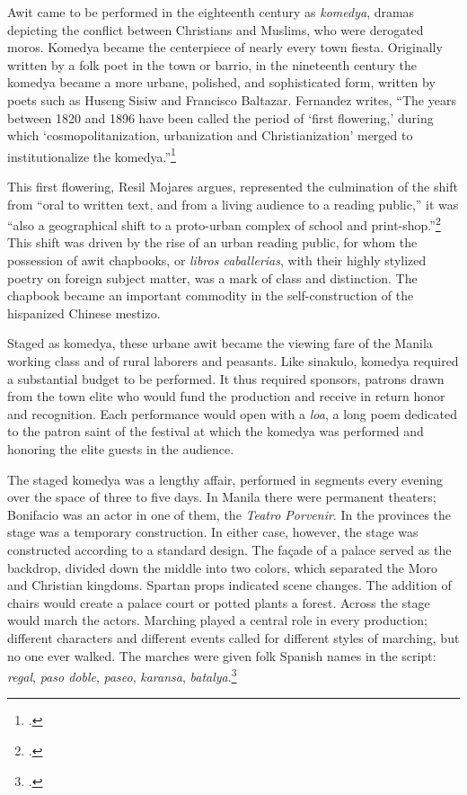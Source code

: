 Awit came to be performed in the eighteenth century as \textit{komedya}, dramas depicting the conflict between Christians and Muslims, who were derogated moros. Komedya became the centerpiece of nearly every town fiesta. Originally written by a folk poet in the town or barrio, in the nineteenth century the komedya became a more urbane, polished, and sophisticated form, written by poets such as Huseng Sisiw and Francisco Baltazar. Fernandez writes, \enquote{The years between 1820 and 1896 have been called the period of \enquote*{first flowering,} during which \enquote*{cosmopolitanization, urbanization and Christianization} merged to institutionalize the komedya.}\footcite[61]{Fernandez1996}

This first flowering, Resil Mojares argues, represented the culmination of the shift from \enquote{oral to written text, and from a living audience to a reading public,} it was \enquote{also a geographical shift to a proto-urban complex of school and print-shop.}\footcite[68]{Mojares1983} This shift was driven by the rise of an urban reading public, for whom the possession of awit chapbooks, or \textit{libros caballerias}, with their highly stylized poetry on foreign subject matter, was a mark of class and distinction. The chapbook became an important commodity in the self-construction of the hispanized Chinese mestizo.

Staged as komedya, these urbane awit became the viewing fare of the Manila working class and of rural laborers and peasants. Like sinakulo, komedya required a substantial budget to be performed. It thus required sponsors, patrons drawn from the town elite who would fund the production and receive in return honor and recognition. Each performance would open with a \textit{loa}, a long poem dedicated to the patron saint of the festival at which the komedya was performed and honoring the elite guests in the audience.

The staged komedya was a lengthy affair, performed in segments every evening over the space of three to five days. In Manila there were permanent theaters; Bonifacio was an actor in one of them, the \textit{Teatro Porvenir}. In the provinces the stage was a temporary construction. In either case, however, the stage was constructed according to a standard design. The fa\c{c}ade of a palace served as the backdrop, divided down the middle into two colors, which separated the Moro and Christian kingdoms. Spartan props indicated scene changes. The addition of chairs would create a palace court or potted plants a forest. Across the stage would march the actors. Marching played a central role in every production; different characters and different events called for different styles of marching, but no one ever walked. The marches were given folk Spanish names in the script: \textit{regal}, \textit{paso doble}, \textit{paseo}, \textit{karansa}, \textit{batalya}.\footcite[67]{Fernandez1996}

